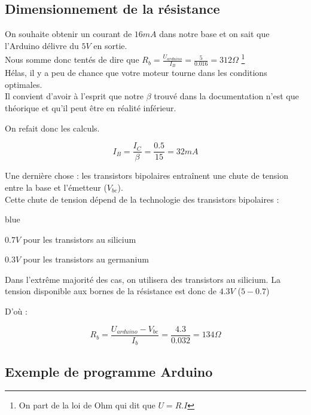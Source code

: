     \subsection{Dimensionnement de la résistance}

    On souhaite obtenir un courant de $16 mA$ dans notre base et on sait que l'Arduino délivre du $5V$ en sortie.\\

    Nous somme donc tentés de dire que $R_b = \frac{U_{arduino}}{ I_{B}} = \frac{5}{0.016} = 312 \Omega$ \footnote{On part de la loi de Ohm qui dit que $U=R.I$}\\


    Hélas, il y a peu de chance que votre moteur tourne dans les conditions optimales.\\
    Il convient d'avoir à l'esprit que notre $\beta$ trouvé dans la documentation n'est que théorique et qu'il peut être en réalité inférieur.

    
    On refait donc les calculs.

    $$  I_{B} = \frac{I_{C}}{\beta} = \frac{0.5}{15} = 32 mA $$

    Une dernière chose : les transistors bipolaires entraînent une chute de tension entre la base et l'émetteur ($V_{be}$).\\
    Cette chute de tension dépend de la technologie des transistors bipolaires : 

    \begin{items}{blue}{\Triangle}

      \item $0.7V$ pour les transistors au silicium
      \item $0.3V$ pour les transistors au germanium
    \end{items}
    Dans l'extrême majorité des cas, on utilisera des transistors au silicium. La tension disponible aux bornes de la résistance est donc de $4.3V$ ($5-0.7$)

    D'où : 

    $$ \boxed{ R_{b} = \frac{U_{arduino}-V_{be}}{I_b} = \frac{4.3}{0.032} = 134 \Omega} $$

    \subsection{Exemple de programme Arduino}

